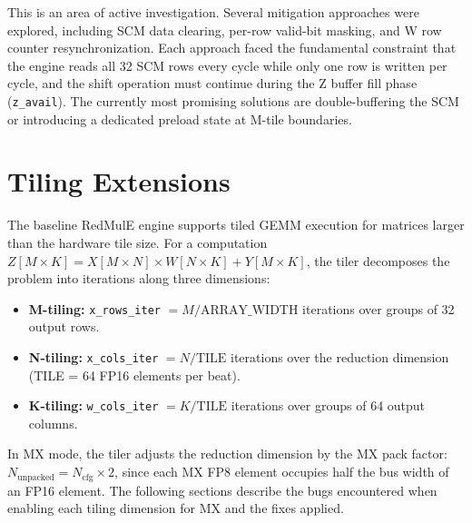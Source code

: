 
This is an area of active investigation. Several mitigation approaches were
explored, including SCM data clearing, per-row valid-bit masking, and W row
counter resynchronization. Each approach faced the fundamental constraint that
the engine reads all 32 SCM rows every cycle while only one row is written per
cycle, and the shift operation must continue during the Z buffer fill phase
(\texttt{z\_avail}). The currently most promising solutions are double-buffering
the SCM or introducing a dedicated preload state at M-tile boundaries.



\section{Tiling Extensions}
\label{sec:tiling}

The baseline RedMulE engine supports tiled GEMM execution for matrices larger
than the hardware tile size. For a computation
$Z[M \times K] = X[M \times N] \times W[N \times K] + Y[M \times K]$, the
tiler decomposes the problem into iterations along three dimensions:

\begin{itemize}
    \item \textbf{M-tiling:} \texttt{x\_rows\_iter} $= M / \text{ARRAY\_WIDTH}$
          iterations over groups of 32 output rows.
    \item \textbf{N-tiling:} \texttt{x\_cols\_iter} $= N / \text{TILE}$
          iterations over the reduction dimension (TILE = 64 FP16 elements per
          beat).
    \item \textbf{K-tiling:} \texttt{w\_cols\_iter} $= K / \text{TILE}$
          iterations over groups of 64 output columns.
\end{itemize}

In MX mode, the tiler adjusts the reduction dimension by the MX pack factor:
$N_\text{unpacked} = N_\text{cfg} \times 2$, since each MX FP8 element occupies
half the bus width of an FP16 element. The following sections describe the bugs
encountered when enabling each tiling dimension for MX and the fixes applied.


